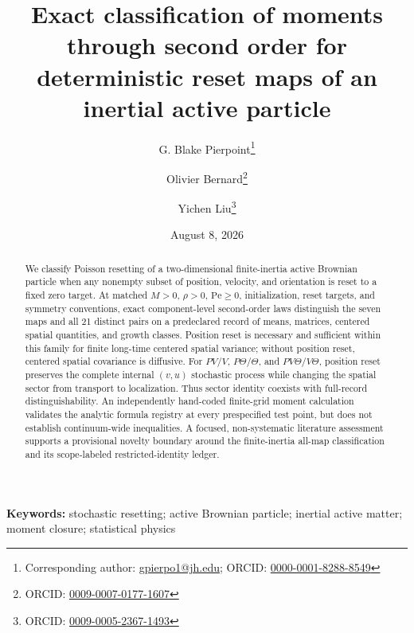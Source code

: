 \documentclass[12pt]{article}
\newcounter{none}
\begin{document}
\title{Exact classification of moments through second order for deterministic reset maps of an inertial active particle}
\author[1]{G. Blake Pierpoint\thanks{Corresponding author: \href{mailto:gpierpo1@jh.edu}{gpierpo1@jh.edu}; ORCID: \href{https://orcid.org/0000-0001-8288-8549}{0000-0001-8288-8549}}}
\author[2,3]{Olivier Bernard\thanks{ORCID: \href{https://orcid.org/0009-0007-0177-1607}{0009-0007-0177-1607}}}
\author[4,3]{Yichen Liu\thanks{ORCID: \href{https://orcid.org/0009-0005-2367-1493}{0009-0005-2367-1493}}}
\date{August 8, 2026}
\maketitle
\begin{abstract}
We classify Poisson resetting of a two-dimensional finite-inertia active Brownian particle when any nonempty subset of position, velocity, and orientation is reset to a fixed zero target. At matched \(M>0\), \(\rho>0\), \(\mathrm{Pe}\ge0\), initialization, reset targets, and symmetry conventions, exact component-level second-order laws distinguish the seven maps and all 21 distinct pairs on a predeclared record of means, matrices, centered spatial quantities, and growth classes. Position reset is necessary and sufficient within this family for finite long-time centered spatial variance; without position reset, centered spatial covariance is diffusive. For \(PV/V\), \(P\Theta/\Theta\), and \(PV\Theta/V\Theta\), position reset preserves the complete internal \((v,u)\) stochastic process while changing the spatial sector from transport to localization. Thus sector identity coexists with full-record distinguishability. An independently hand-coded finite-grid moment calculation validates the analytic formula registry at every prespecified test point, but does not establish continuum-wide inequalities. A focused, non-systematic literature assessment supports a provisional novelty boundary around the finite-inertia all-map classification and its scope-labeled restricted-identity ledger.
\end{abstract}
\noindent\textbf{Keywords:} stochastic resetting; active Brownian particle; inertial active matter; moment closure; statistical physics

\end{document}
